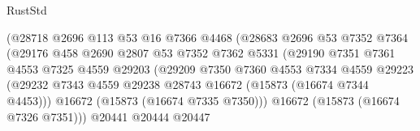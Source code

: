 \begin{lexlean}{RustStd}
\begin{coremodule}
                                        (@28718
                                          @2696
                                          @113
                                          @53
                                          @16
                                          @7366
                                          @4468
                                          (@28683
                                            @2696
                                            @53
                                            @7352
                                            @7364
                                            (@29176
                                              @458
                                              @2690
                                              @2807
                                              @53
                                              @7352
                                              @7362
                                              @5331
                                              (@29190
                                                @7351
                                                @7361
                                                @4553
                                                @7325
                                                @4559
                                                @29203
                                                (@29209
                                                  @7350
                                                  @7360
                                                  @4553
                                                  @7334
                                                  @4559
                                                  @29223
                                                  (@29232
                                                    @7343
                                                    @4559
                                                    @29238
                                                    @28743
                                                    @16672
                                                    (@15873 (@16674 @7344 @4453)))
                                                  @16672
                                                  (@15873 (@16674 @7335 @7350)))
                                                @16672
                                                (@15873 (@16674 @7326 @7351)))
                                              @20441
                                              @20444
                                              @20447

\end{coremodule}
\end{lexlean}
